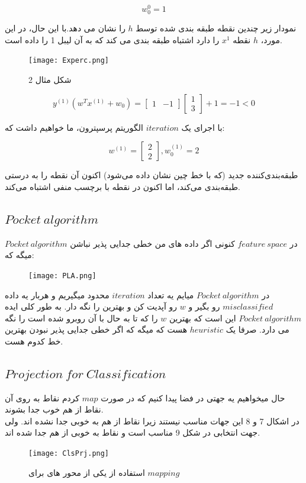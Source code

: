 \documentclass[12pt]{article}
\begin{document}
\[
w^0_0=1
\]

نمودار زیر چندین نقطه طبقه بندی شده توسط $h$ را نشان می دهد.با این حال، در این مورد، $h$ نقطه $x^1$ را دارد اشتباه طبقه بندی می کند که به آن لیبل 1 را داده است.

\begin{figure}[h]
    \centering
    \texttt{[image: Experc.png]}
    \caption{شکل مثال 2}
    \label{fig:}
\end{figure}


\[
y^{(1)}(w^{T}x^{(1)}+w_{0})=\begin{bmatrix}1 & -1\end{bmatrix}\begin{bmatrix}1 \\ 3\end{bmatrix}+1=-1<0
\]

با اجرای یک $iteration$ الگوریتم پرسپترون، ما خواهیم داشت که:

\[
w^{(1)}=\begin{bmatrix}2 \\ 2\end{bmatrix},
w^{(1)}_0=2
\]

طبقه‌بندی‌کننده جدید (که با خط چین نشان داده می‌شود) اکنون آن نقطه را به درستی طبقه‌بندی می‌کند، اما اکنون در نقطه با برچسب منفی اشتباه می‌کند.



\subsection{$Pocket\:algorithm$}
در $feature\:space$ کنونی اگر داده های من خطی جدایی پذیر نباشن $Pocket\:algorithm$ میگه که:

\begin{figure}[h]
    \centering
    \texttt{[image: PLA.png]}
    \label{fig:}
\end{figure}

در $Pocket\:algorithm$ میایم یه تعداد $iteration$ محدود میگیریم و هربار یه داده $misclassified$ رو بگیر و $w$ رو آپدیت کن و بهترین را نگه دار.
به طور کلی ایده $Pocket\:algorithm$ این است که بهترین $w$ را که تا به حال با آن روبرو شده است را نگه می دارد. صرفا یک $heuristic$ هست که میگه که اگر خطی جدایی پذیر نبودن بهترین خط کدوم هست.


\subsection{$Projection\:for\:Classification$}
حال میخواهیم یه جهتی در فضا پیدا کنیم که در صورت $map$ کردم نقاط به روی آن نقاط از هم خوب جدا بشوند.
\\
در اشکال 7 و 8 این جهات مناسب نیستند زیرا نقاط از هم به خوبی جدا نشده اند. ولی جهت انتخابی در شکل 9 مناسب است و نقاط به خوبی از هم جدا شده اند.
\begin{figure}[h]
    \centering
    \texttt{[image: ClsPrj.png]}
    \caption{استفاده از یکی از محور های برای $mapping$}
    \label{fig:}
\end{figure}
\end{document}
